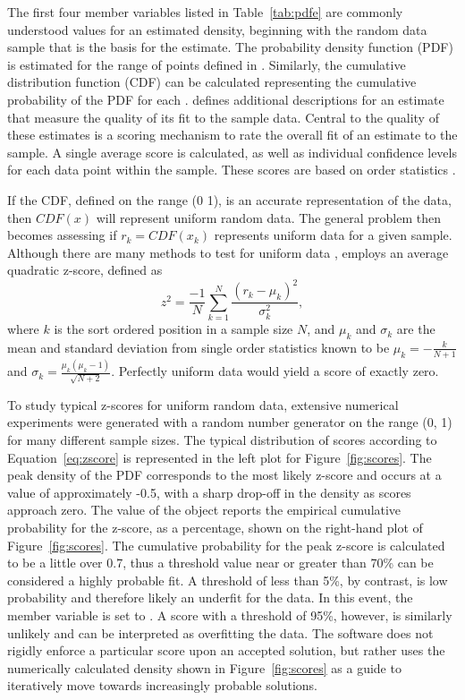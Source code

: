 The first four member variables listed in Table~\ref{tab:pdfe} are commonly understood values for an estimated density, beginning with the random data sample that is the basis for the estimate. The probability density function (PDF) is estimated for the range of points defined in . Similarly, the cumulative distribution function (CDF) can be calculated representing the cumulative probability of the PDF for each .  defines additional descriptions for an estimate that measure the quality of its fit to the sample data. Central to the quality of these estimates is a scoring mechanism to rate the overall fit of an estimate to the sample. A single average score is calculated, as well as individual confidence levels for each data point within the sample. These scores are based on order statistics \citep{order}.

If the CDF, defined on the range (0 1), is an accurate representation of the data, then $CDF(x)$ will represent uniform random data. The general problem then becomes assessing if $r_k=CDF(x_k)$ represents uniform data for a given sample. Although there are many methods to test for uniform data \citep{PDFe2},  employs an average quadratic z-score, defined as 
\begin{equation} \label{eq:zscore}
z^2=\frac{-1}{N} \sum_{k=1}^{N}\frac{\left(r_k-\mu_k\right)^2}{\sigma_k^2},
\end{equation}
where $k$ is the sort ordered position in a sample size $N$, and $\mu_k$ and $\sigma_k$ are the mean and standard deviation from single order statistics known to be $\mu_k=-\frac{k}{N+1}$ and $\sigma_k=\frac{\mu_k\left(\mu_k-1\right)}{\sqrt{N+2}}$. Perfectly uniform data would yield a score of exactly zero.

To study typical z-scores for uniform random data, extensive numerical experiments were generated with a random number generator on the range (0, 1) for many different sample sizes. The typical distribution of scores according to Equation~\ref{eq:zscore} is represented in the left plot for Figure~\ref{fig:scores}. The peak density of the PDF corresponds to the most likely z-score and occurs at a value of approximately -0.5, with a sharp drop-off in the density as scores approach zero. The  value of the  object reports the empirical cumulative probability for the z-score, as a percentage, shown on the right-hand plot of Figure~\ref{fig:scores}. The cumulative probability for the peak z-score is calculated to be a little over 0.7, thus a threshold value near or greater than 70\% can be considered a highly probable fit. A threshold of less than 5\%, by contrast, is low probability and therefore likely an underfit for the data. In this event, the  member variable   is set to .  A score with a threshold of 95\%, however, is similarly unlikely and can be interpreted as overfitting the data. The software does not rigidly enforce a particular score upon an accepted solution, but rather uses the numerically calculated density shown in Figure~\ref{fig:scores} as a guide to iteratively move towards increasingly probable solutions. 

